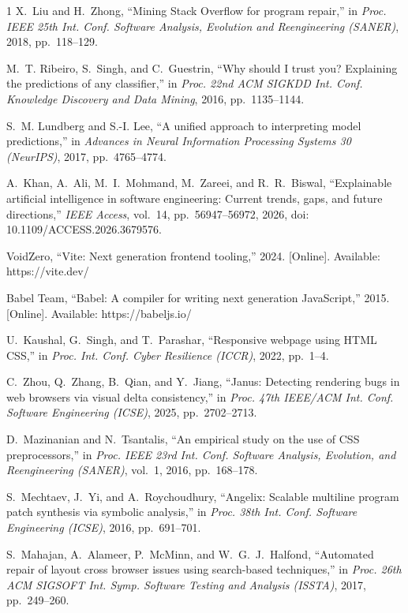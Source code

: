 \documentclass[conference]{IEEEtran}
\begin{document}
\begin{thebibliography}{1}
X.~Liu and H.~Zhong, ``Mining Stack Overflow for program repair,'' in
\emph{Proc. IEEE 25th Int. Conf. Software Analysis, Evolution and
Reengineering (SANER)}, 2018, pp.~118--129.

M.~T. Ribeiro, S.~Singh, and C.~Guestrin, ``Why should I trust you?
Explaining the predictions of any classifier,'' in \emph{Proc. 22nd ACM
SIGKDD Int. Conf. Knowledge Discovery and Data Mining}, 2016,
pp.~1135--1144.

S.~M. Lundberg and S.-I. Lee, ``A unified approach to interpreting model
predictions,'' in \emph{Advances in Neural Information Processing
Systems 30 (NeurIPS)}, 2017, pp.~4765--4774.

A.~Khan, A.~Ali, M.~I.~Mohmand, M.~Zareei, and R.~R.~Biswal,
``Explainable artificial intelligence in software engineering: Current
trends, gaps, and future directions,'' \emph{IEEE Access}, vol.~14,
pp.~56947--56972, 2026, doi: 10.1109/ACCESS.2026.3679576.

VoidZero, ``Vite: Next generation frontend tooling,'' 2024. [Online].
Available: https://vite.dev/

Babel Team, ``Babel: A compiler for writing next generation JavaScript,''
2015. [Online]. Available: https://babeljs.io/

U.~Kaushal, G.~Singh, and T.~Parashar, ``Responsive webpage using HTML
CSS,'' in \emph{Proc. Int. Conf. Cyber Resilience (ICCR)}, 2022,
pp.~1--4.

C.~Zhou, Q.~Zhang, B.~Qian, and Y.~Jiang, ``Janus: Detecting rendering
bugs in web browsers via visual delta consistency,'' in \emph{Proc.
47th IEEE/ACM Int. Conf. Software Engineering (ICSE)}, 2025,
pp.~2702--2713.

D.~Mazinanian and N.~Tsantalis, ``An empirical study on the use of CSS
preprocessors,'' in \emph{Proc. IEEE 23rd Int. Conf. Software
Analysis, Evolution, and Reengineering (SANER)}, vol.~1, 2016,
pp.~168--178.

S.~Mechtaev, J.~Yi, and A.~Roychoudhury, ``Angelix: Scalable multiline
program patch synthesis via symbolic analysis,'' in \emph{Proc. 38th
Int. Conf. Software Engineering (ICSE)}, 2016, pp.~691--701.

S.~Mahajan, A.~Alameer, P.~McMinn, and W.~G.~J.~Halfond, ``Automated
repair of layout cross browser issues using search-based techniques,''
in \emph{Proc. 26th ACM SIGSOFT Int. Symp. Software Testing and
Analysis (ISSTA)}, 2017, pp.~249--260.


\end{thebibliography}
\end{document}
